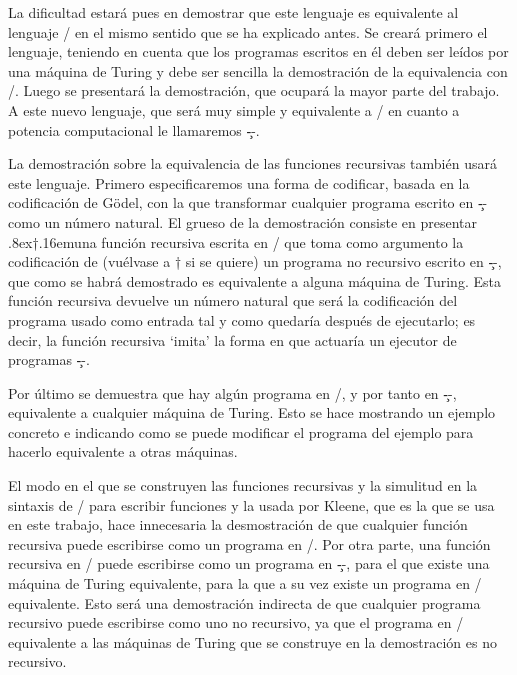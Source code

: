La dificultad estará pues en demostrar que este lenguaje es equivalente al lenguaje \C/ en el mismo
sentido que se ha explicado antes. Se creará primero el lenguaje, teniendo en cuenta que los
programas escritos en él deben ser leídos por una máquina de Turing y debe ser sencilla la
demostración de la equivalencia con \C/. Luego se presentará la demostración, que ocupará la mayor
parte del trabajo. A este nuevo lenguaje, que será muy simple y equivalente a \C/ en cuanto a potencia
computacional le llamaremos \c--.

La demostración sobre la equivalencia de las funciones recursivas también usará este
lenguaje. Primero especificaremos una forma de codificar, basada en la codificación de Gödel, con la
que transformar cualquier programa escrito en \c-- como un número natural. El grueso de la
demostración consiste en presentar { \raise.8ex\hbox{†}\kern.16em}una función recursiva
escrita en \C/ que toma como argumento la codificación de (vuélvase a † si se quiere) un programa no
recursivo escrito en \c--, que como se habrá demostrado es equivalente a alguna máquina de
Turing. Esta función recursiva devuelve un número natural que será la codificación del programa
usa\-do como entrada tal y como quedaría después de ejecutarlo; es decir, la función recursiva
‘imita’ la forma en que actuaría un ejecutor de programas \c--.

Por último se demuestra que hay algún programa en \C/, y por tanto en \c--, equivalente a cualquier
máquina de Turing. Esto se hace mostrando un ejemplo concreto e indicando como se puede modificar el
programa del ejemplo para hacerlo equivalente a otras máquinas.

El modo en el que se construyen las funciones recursivas y la simulitud en la sintaxis de \C/ para
escribir funciones y la usada por Kleene, que es la que se usa en este trabajo, hace innecesaria la
desmostración de que cualquier función recursiva puede escribirse como un programa en \C/. Por otra
parte, una función recursiva en \C/ puede escribirse como un programa en \c--, para el que existe una
máquina de Turing equivalente, para la que a su vez existe un programa en \C/ equivalente. Esto será
una demostración indirecta de que cualquier programa recursivo puede escribirse como uno no
recursivo, ya que el programa en \C/ equivalente a las máquinas de Turing que se construye en la
demostración es no recursivo.
